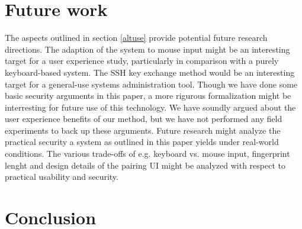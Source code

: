 \documentclass[12pt,a4paper,notitlepage]{article}
\begin{document}
\section{Future work}

The aspects outlined in section \ref{altuse} provide potential future research directions. The adaption of the system to
mouse input might be an interesting target for a user experience study, particularly in comparison with a purely
keyboard-based system. The SSH key exchange method would be an interesting target for a general-use systems
administration tool. Though we have done some basic security arguments in this paper, a more rigurous formalization
might be interresting for future use of this technology. We have soundly argued about the user experience benefits of
our method, but we have not performed any field experiments to back up these arguments. Future research might analyze
the practical security a system as outlined in this paper yields under real-world conditions. The various trade-offs of
e.g. keyboard vs. mouse input, fingerprint lenght and design details of the pairing UI might be analyzed with respect to
practical usability and security.

\section{Conclusion}


%
\end{document}
